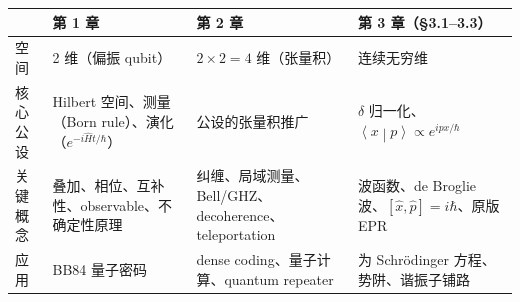 \documentclass[11pt]{ctexart}
\newcommand{\braket}[2]{\left\langle#1\middle|#2\right\rangle}
\newcommand{\op}[1]{\hat{#1}}
\begin{document}
\begin{center}
\begin{tabular}{p{2.2cm}p{3.6cm}p{4.6cm}p{4.2cm}}
\toprule
 & 第 1 章 & 第 2 章 & 第 3 章（\S3.1--3.3）\\
\midrule
空间 & 2 维（偏振 qubit） & $2\times2=4$ 维（张量积） & 连续无穷维\\
核心公设 & Hilbert 空间、测量（Born rule）、演化（$e^{-i\op Ht/\hbar}$） & 公设的张量积推广 & $\delta$ 归一化、$\braket xp\propto e^{ipx/\hbar}$\\
关键概念 & 叠加、相位、互补性、observable、不确定性原理 & 纠缠、局域测量、Bell/GHZ、decoherence、teleportation & 波函数、de Broglie 波、$[\op x,\op p]=i\hbar$、原版 EPR\\
应用 & BB84 量子密码 & dense coding、量子计算、quantum repeater & 为 Schrödinger 方程、势阱、谐振子铺路\\
\bottomrule
\end{tabular}
\end{center}
\end{document}
